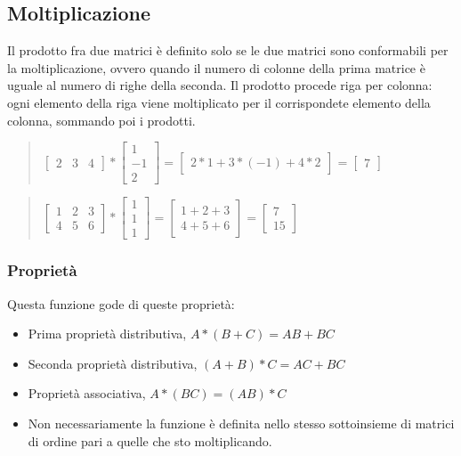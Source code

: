 \documentclass[a4paper]{article}
\begin{document}
\subsection{Moltiplicazione}
Il prodotto fra due matrici è definito solo se le due matrici sono conformabili per la moltiplicazione, ovvero quando il numero di colonne della prima matrice è uguale al numero di righe della seconda. Il prodotto procede riga per colonna: ogni elemento della riga viene moltiplicato per il corrispondete elemento della colonna, sommando poi i prodotti.
\\
\begin{quote} \centering $\left[\begin{matrix} 2 & 3 & 4\end{matrix}\right] * \left[\begin{matrix}1 \\ -1 \\ 2 \end{matrix}\right] = \left[\begin{matrix}2*1 + 3*(-1) + 4*2 \end{matrix}\right]= \left[\begin{matrix}7\end{matrix}\right]
$\end{quote}
\begin{quote} \centering $\left[\begin{matrix} 1 & 2 & 3 \\ 4 & 5 & 6\end{matrix}\right] * \left[\begin{matrix}1 \\ 1 \\ 1 \end{matrix}\right] = \left[\begin{matrix} 1 + 2 + 3\\ 4 + 5 + 6 \end{matrix}\right]= \left[\begin{matrix}7 \\ 15 \end{matrix}\right]
$\end{quote}
\subsubsection{Proprietà}
Questa funzione gode di queste proprietà:
\begin{itemize}
\item Prima proprietà distributiva, $A*(B + C) = AB + BC$
\item Seconda proprietà distributiva, $(A + B)*C = AC +BC$
\item Proprietà associativa, $A*(BC) = (AB)*C$
\item Non necessariamente la funzione è definita nello stesso sottoinsieme di matrici di ordine pari a quelle che sto moltiplicando.
\end{itemize}
\end{document}

